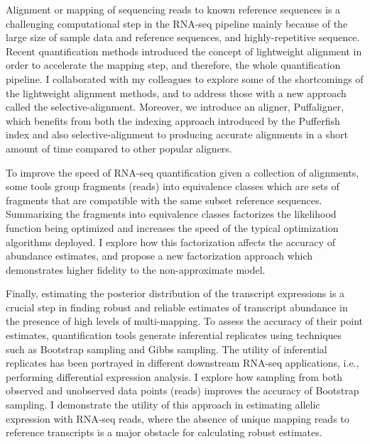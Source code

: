 Alignment or mapping of sequencing reads to known reference sequences is 
a challenging computational step in the RNA-seq pipeline mainly because of 
the large size of sample data and reference sequences, and highly-repetitive 
sequence. Recent quantification methods introduced the concept of lightweight 
alignment in order to accelerate the mapping step, and therefore, the whole 
quantification pipeline. I collaborated with my colleagues to explore some 
of the shortcomings of the lightweight alignment methods, and to address 
those with a new approach called the selective-alignment. Moreover, we 
introduce an aligner, Puffaligner, which benefits from both the indexing 
approach introduced by the Pufferfish index and also selective-alignment 
to producing accurate alignments in a short amount of time compared to other 
popular aligners.

To improve the speed of RNA-seq quantification given a collection of alignments, 
some tools group fragments (reads) into equivalence classes which are sets of 
fragments that  are compatible with the same subset reference sequences. 
Summarizing the fragments into equivalence classes  factorizes the likelihood 
function being optimized and increases the speed of the typical optimization 
algorithms deployed. I explore how this factorization affects the accuracy of 
abundance estimates, and propose a new factorization approach which demonstrates 
higher fidelity to the non-approximate model.

Finally, estimating the posterior distribution of the transcript expressions is 
a crucial step in finding robust and reliable estimates of transcript abundance 
in the presence of high levels of multi-mapping. To assess the accuracy of their 
point estimates, quantification tools generate inferential replicates using 
techniques such as Bootstrap sampling and Gibbs sampling. The utility of inferential 
replicates has been portrayed in different downstream RNA-seq applications, i.e., 
performing differential expression analysis. I explore how sampling from both 
observed and unobserved data points (reads) improves the accuracy of Bootstrap 
sampling. I demonstrate the utility of this approach in estimating allelic 
expression with RNA-seq reads, where the absence of unique mapping reads to 
reference transcripts is a major obstacle for calculating robust estimates.